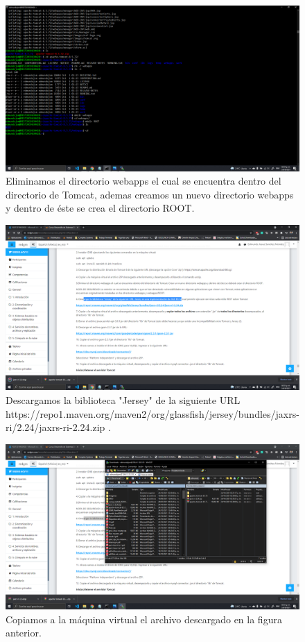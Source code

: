 \documentclass[11pt]{article}
\begin{document}
		\begin{figure}[H]
			\centering
			\includegraphics[scale=0.34]{resources/p5.png}
			\caption{Eliminamos el directorio webapps el cual se encuentra dentro del directorio de Tomcat, ademas creamos un nuevo directorio webapps y dentro de éste se crea el directorio ROOT.}\label{fig:picture}
		\end{figure}
		\begin{figure}[H]
			\centering
			\includegraphics[scale=0.34]{resources/p6.png}
			\caption{Descargamos la biblioteca "Jersey" de la siguiente URL https://repo1.maven.org/maven2/org/glassfish/jersey/bundles/jaxrs-ri/2.24/jaxrs-ri-2.24.zip
.}\label{fig:picture}
		\end{figure}
		\begin{figure}[H]
			\centering
			\includegraphics[scale=0.34]{resources/p7.1.png}
			\caption{Copiamos a la máquina virtual el archivo descargado en la figura anterior.}\label{fig:picture}
		\end{figure}
\end{document}

